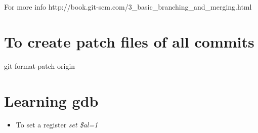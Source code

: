 \documentclass[a4paper,10pt]{article}
\begin{document}
For more info http://book.git-scm.com/3\_basic\_branching\_and\_merging.html\\

\section{To create patch files of all commits}
git format-patch origin
\section{Learning gdb}

\begin{itemize}
\item To set a register \emph{set \$al=1}
\end{itemize}
\end{document}
